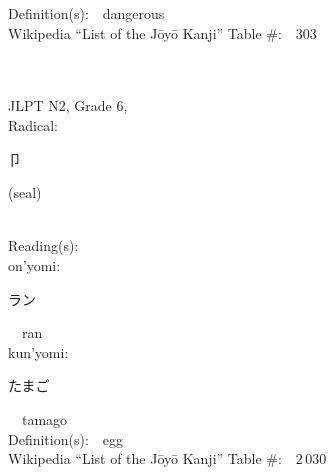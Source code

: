 \begin{multicols}{2}
Definition(s):\ \ dangerous \\
Wikipedia ``List of the J\=oy\=o Kanji'' Table \#:\ \ 303 \\
\ \ \\
{\fontsize{34pt}{40pt}  }\ \ \\  %
{JLPT N2, Grade 6, \\Radical:\ \ {\begin{CJK}{UTF8}{min} 卩 \end{CJK}} (seal) } \\
Reading(s):\ \ \\
{\hspace*{1em}}on'yomi:\ \ \\
{\hspace*{2em}}{\begin{CJK}{UTF8}{min} ラン \end{CJK}}\ \ ran\ \ \\
{\hspace*{1em}}kun'yomi:\ \ \\
{\hspace*{2em}}{\begin{CJK}{UTF8}{min} たまご \end{CJK}}\ \ tamago\ \ \\
Definition(s):\ \ egg \\
Wikipedia ``List of the J\=oy\=o Kanji'' Table \#:\ \ 2\,030 \\
\ \ \\
\end{multicols}



